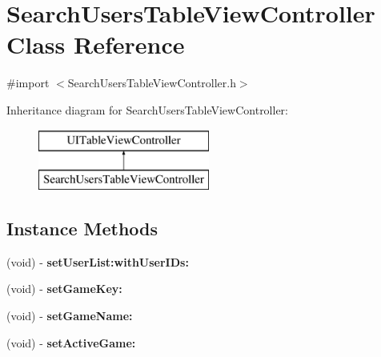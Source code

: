 \hypertarget{interface_search_users_table_view_controller}{\section{Search\+Users\+Table\+View\+Controller Class Reference}
\label{interface_search_users_table_view_controller}
}


{\ttfamily \#import $<$Search\+Users\+Table\+View\+Controller.\+h$>$}

Inheritance diagram for Search\+Users\+Table\+View\+Controller\+:\begin{figure}[H]
\begin{center}
\leavevmode
\includegraphics[height=2.000000cm]{interface_search_users_table_view_controller}
\end{center}
\end{figure}
\subsection*{Instance Methods}
\begin{DoxyCompactItemize}
\item 
\hypertarget{interface_search_users_table_view_controller_a1b4e35102f4ca03e4e7b4aec2ebf434b}{(void) -\/ {\bfseries set\+User\+List\+:with\+User\+I\+Ds\+:}}\label{interface_search_users_table_view_controller_a1b4e35102f4ca03e4e7b4aec2ebf434b}

\item 
\hypertarget{interface_search_users_table_view_controller_af85a061bc1879ab1b14fa1456abcef72}{(void) -\/ {\bfseries set\+Game\+Key\+:}}\label{interface_search_users_table_view_controller_af85a061bc1879ab1b14fa1456abcef72}

\item 
\hypertarget{interface_search_users_table_view_controller_a1810d97565d73b18f230b6a636fab125}{(void) -\/ {\bfseries set\+Game\+Name\+:}}\label{interface_search_users_table_view_controller_a1810d97565d73b18f230b6a636fab125}

\item 
\hypertarget{interface_search_users_table_view_controller_a68b4b3312cf7b98997e22fcba139ccd0}{(void) -\/ {\bfseries set\+Active\+Game\+:}}\label{interface_search_users_table_view_controller_a68b4b3312cf7b98997e22fcba139ccd0}

\end{DoxyCompactItemize}


